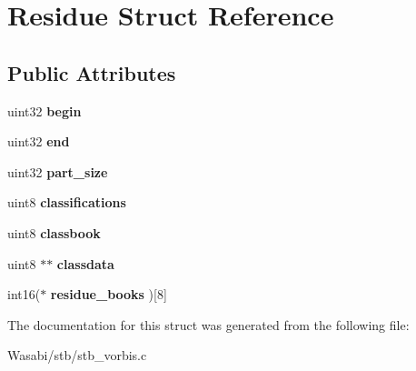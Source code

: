 \hypertarget{struct_residue}{}\section{Residue Struct Reference}
\label{struct_residue}
\subsection*{Public Attributes}
\begin{DoxyCompactItemize}
\item 
uint32 {\bfseries begin}\hypertarget{struct_residue_ad6316cbcc989ab6c2d85147cc7effeca}{}\label{struct_residue_ad6316cbcc989ab6c2d85147cc7effeca}

\item 
uint32 {\bfseries end}\hypertarget{struct_residue_a79e5b0b56d8d18fbf350e8f9d7841f8e}{}\label{struct_residue_a79e5b0b56d8d18fbf350e8f9d7841f8e}

\item 
uint32 {\bfseries part\+\_\+size}\hypertarget{struct_residue_a88f3f7afce7f7ef97a62c71e5b7fbf3b}{}\label{struct_residue_a88f3f7afce7f7ef97a62c71e5b7fbf3b}

\item 
uint8 {\bfseries classifications}\hypertarget{struct_residue_a7990d602ad1221a4074bd3fb2b6396e4}{}\label{struct_residue_a7990d602ad1221a4074bd3fb2b6396e4}

\item 
uint8 {\bfseries classbook}\hypertarget{struct_residue_a2162b2f7f3ac4358a2983f5d372741b1}{}\label{struct_residue_a2162b2f7f3ac4358a2983f5d372741b1}

\item 
uint8 $\ast$$\ast$ {\bfseries classdata}\hypertarget{struct_residue_a079f9b89fb84d8cec7829a640c0f0f85}{}\label{struct_residue_a079f9b89fb84d8cec7829a640c0f0f85}

\item 
int16($\ast$ {\bfseries residue\+\_\+books} )\mbox{[}8\mbox{]}\hypertarget{struct_residue_ad8abf85a933f167664f1113b8c0b83a8}{}\label{struct_residue_ad8abf85a933f167664f1113b8c0b83a8}

\end{DoxyCompactItemize}


The documentation for this struct was generated from the following file\+:\begin{DoxyCompactItemize}
\item 
Wasabi/stb/stb\+\_\+vorbis.\+c\end{DoxyCompactItemize}
